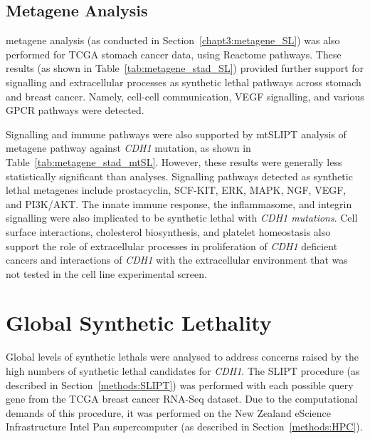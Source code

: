\FloatBarrier

\subsection{Metagene Analysis} \label{chapt3:metagene_stad_SL}

\Gls{metagene} analysis (as conducted in Section~\ref{chapt3:metagene_SL}) was also performed for \gls{TCGA} stomach cancer  data, using Reactome pathways. These results (as shown in Table~\ref{tab:metagene_stad_SL}) provided further support for signalling and extracellular processes as \gls{synthetic lethal} pathways across stomach and breast cancer. Namely, cell-cell communication, VEGF signalling, and various \gls{GPCR} pathways were detected.  

Signalling and immune pathways were also supported by \acrshort{mtSLIPT} analysis of \gls{metagene} pathway  against \textit{CDH1} \gls{mutation}, as shown in Table~\ref{tab:metagene_stad_mtSL}. However, these results were generally less statistically significant than  analyses. Signalling pathways detected as \gls{synthetic lethal} \glspl{metagene} include prostacyclin, SCF-KIT, ERK, MAPK, NGF, VEGF, and PI3K/AKT. The innate immune response, the inflammasome, and integrin signalling were also implicated to be \gls{synthetic lethal} with \textit{CDH1 \glspl{mutation}}. Cell surface interactions, cholesterol biosynthesis, and platelet homeostasis also support the role of extracellular processes in proliferation of \textit{CDH1} deficient cancers and interactions of \textit{CDH1} with the extracellular environment that was not tested in the cell line experimental screen.

\fi

\FloatBarrier

\iffalse
\section{Global Synthetic Lethality}

Global levels of \glspl{synthetic lethal} were analysed to address concerns raised by the high numbers of \gls{synthetic lethal} candidates for \textit{CDH1}. The \gls{SLIPT} procedure (as described in Section~\ref{methods:SLIPT}) was performed with each possible query gene from the \gls{TCGA} breast cancer \acrshort{RNA}-Seq dataset. Due to the computational demands of this procedure, it was performed on the New Zealand eScience Infrastructure Intel Pan supercomputer (as described in Section~\ref{methods:HPC}).


